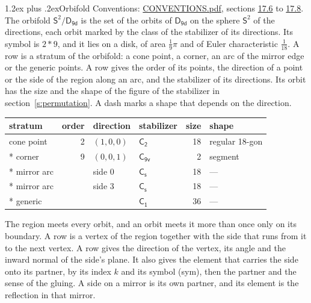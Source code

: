 \documentclass[10pt,a4paper]{article}
\makeatletter
\renewcommand\section{\@startsection{section}{1}{\z@}{-3ex plus -1ex minus -.2ex}%
  {1.2ex plus .2ex}{\normalfont\large\sffamily\bfseries\color{parttitle}}}
\numberwithin{equation}{section}
\newcommand{\grp}[1]{\mathsf{#1}}
\newcommand{\orbname}[1]{#1}
\newcommand{\dirvec}[3]{(#1, #2, #3)}
\newcommand{\twosphere}{\mathsf{S}^{2}}
\makeatother
\begin{document}
\section{Orbifold}\label{s:orbifold}
Conventions: \href{../../CONVENTIONS.pdf}{CONVENTIONS.pdf}, sections \href{../../CONVENTIONS.pdf\#conv.17.6}{17.6} to \href{../../CONVENTIONS.pdf\#conv.17.8}{17.8}.
The orbifold $\twosphere/\grp{D_{9d}}$ is the set of the orbits of $\grp{D_{9d}}$ on the sphere $\twosphere$ of the directions, each orbit marked by the class of the stabilizer of its directions. Its symbol is $\orbname{2{\ast}9}$, and it lies on a disk, of area $\tfrac{1}{9}\pi$ and of Euler characteristic $\tfrac{1}{18}$.
\leavevmode\label{n:head.stratum}\label{n:head.order.point}\label{n:head.direction}\label{n:head.stabilizer}\label{n:head.size.orbit}\label{n:head.shape}A row is a stratum of the orbifold: a cone point, a corner, an arc of the mirror edge or the generic points. A row gives the order of its points, the direction of a point or the side of the region along an arc, and the stabilizer of its directions. Its orbit has the size and the shape of the figure of the stabilizer in section~\ref{s:permutation}. A dash marks a shape that depends on the direction.
{\small\setlength{\tabcolsep}{4pt}\begin{longtable}{@{}lrllrl@{}}\toprule
stratum & order & direction & stabilizer & size & shape\\\midrule\endhead
\bottomrule\endfoot\endlastfoot
cone point & 2 & $\dirvec{1}{0}{0}$ & \href{C2.pdf}{$\grp{C_{2}}$} & 18 & regular 18-gon\\*
corner & 9 & $\dirvec{0}{0}{1}$ & \href{C9v.pdf}{$\grp{C_{9v}}$} & 2 & segment\\*
mirror arc &  & side 0 & \href{C1v.pdf}{$\grp{C_{s}}$} & 18 & ---\\*
mirror arc &  & side 3 & \href{C1v.pdf}{$\grp{C_{s}}$} & 18 & ---\\*
generic &  &  & \href{C1.pdf}{$\grp{C_{1}}$} & 36 & ---\\
\bottomrule\end{longtable}}
\leavevmode\label{n:head.vertex.region}\label{n:head.angle}\label{n:head.normal.side}\label{n:head.partner}\label{n:head.sense}The region meets every orbit, and an orbit meets it more than once only on its boundary. A row is a vertex of the region together with the side that runs from it to the next vertex. A row gives the direction of the vertex, its angle and the inward normal of the side's plane. It also gives the element that carries the side onto its partner, by its index $k$ and its symbol (sym), then the partner and the sense of the gluing. A side on a mirror is its own partner, and its element is the reflection in that mirror.
\end{document}
